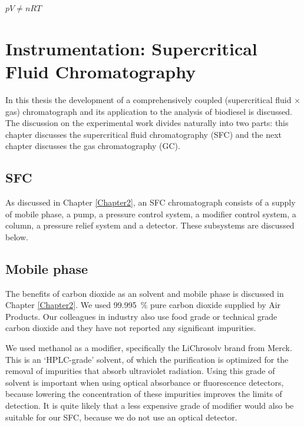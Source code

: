 
\begin{savequote}[\quotewidth]
\(pV \neq nRT\) 
\end{savequote}

\chapter{Instrumentation: Supercritical Fluid Chromatography} %

\label{Chapter4} %

In this thesis the development of a comprehensively coupled (supercritical fluid
× gas) chromatograph and its application to the analysis of biodiesel is
discussed. The discussion on the experimental work divides naturally into two
parts: this chapter discusses the supercritical fluid chromatography (SFC) and
the next chapter discusses the gas chromatography (GC).

\section{SFC}

As discussed in Chapter \ref{Chapter2}, an SFC chromatograph consists of a
supply of mobile phase, a pump, a pressure control system, a modifier control
system, a column, a pressure relief system and a detector. These subsystems are
discussed below.

\section{Mobile phase}

The benefits of carbon dioxide as an solvent and mobile phase is discussed in
Chapter \ref{Chapter2}. We used \SI{99.995}{\percent} pure carbon dioxide
supplied by Air Products. Our colleagues in industry also use food grade or
technical grade carbon dioxide and they have not reported any significant
impurities.

We used methanol as a modifier, specifically the LiChrosolv\textregistered{}
brand from Merck. This is an `HPLC-grade' solvent, of which the purification is
optimized for the removal of impurities that absorb ultraviolet radiation. Using
this grade of solvent is important when using optical absorbance or fluorescence
detectors, because lowering the concentration of these impurities improves the
limits of detection. It is quite likely that a less expensive grade of modifier
would also be suitable for our SFC, because we do not use an optical detector.

